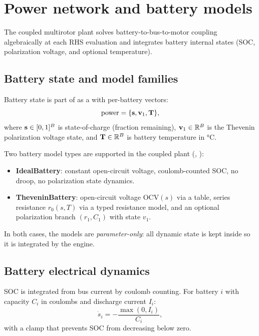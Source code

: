 \section{Power network and battery models}
\label{sec:power}

The coupled multirotor plant solves battery-to-bus-to-motor coupling algebraically at each RHS evaluation and integrates battery internal states (SOC, polarization voltage, and optional temperature).

\subsection{Battery state and model families}
\label{sec:battery-model}

Battery state is part of  as a  with per-battery vectors:
\begin{equation}
  \text{power} = \{\mathbf{s}, \mathbf{v}_1, \mathbf{T}\},
\end{equation}
where $\mathbf{s}\in[0,1]^B$ is state-of-charge (fraction remaining), $\mathbf{v}_1\in\mathbb{R}^B$ is the Thevenin polarization voltage state, and $\mathbf{T}\in\mathbb{R}^B$ is battery temperature in \si{\celsius}.

Two battery model types are supported in the coupled plant (, ):
\begin{itemize}[leftmargin=*,itemsep=2pt]
  \item \textbf{IdealBattery}: constant open-circuit voltage, coulomb-counted SOC, no droop, no polarization state dynamics.
  \item \textbf{TheveninBattery}: open-circuit voltage $\mathrm{OCV}(s)$ via a table, series resistance $r_0(s,T)$ via a typed resistance model, and an optional polarization branch $(r_1, C_1)$ with state $v_1$.
\end{itemize}

In both cases, the models are \emph{parameter-only}: all dynamic state is kept inside  so it is integrated by the engine.

\subsection{Battery electrical dynamics}

SOC is integrated from bus current by coulomb counting. For battery $i$ with capacity $C_i$ in coulombs and discharge current $I_i$:
\begin{equation}
  \dot{s}_i = -\frac{\max(0, I_i)}{C_i},
\end{equation}
with a clamp that prevents SOC from decreasing below zero.

